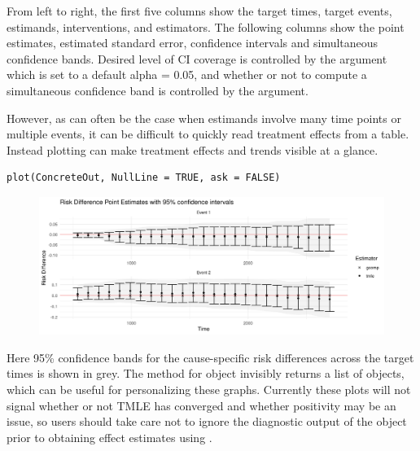 \documentclass{report}
\newcommand{\1}{\ensuremath{\mathbf{1}}}
\begin{document}
From left to right, the first five columns show the target times, target events, estimands, interventions, and estimators. The following columns show the point estimates, estimated standard error, confidence intervals and simultaneous confidence bands. Desired level of CI coverage is controlled by the  argument which is set to a default alpha = 0.05, and whether or not to compute a simultaneous confidence band is controlled by the  argument.

However, as can often be the case when estimands involve many time points or multiple events, it can be difficult to quickly read treatment effects from a table. Instead plotting can make treatment effects and trends visible at a glance.

\lstset{language=r,label= ,caption= ,captionpos=b,numbers=none}
\begin{lstlisting}
plot(ConcreteOut, NullLine = TRUE, ask = FALSE)
\end{lstlisting}

\begin{figure}[H]
\includegraphics[width=\linewidth]{fig/concrete-pbc.png}
\end{figure}

Here 95\% confidence bands for the cause-specific risk differences across the target times is shown in grey. The  method for  object invisibly returns a list of  objects, which can be useful for personalizing these graphs. Currently these plots will not signal whether or not TMLE has converged and whether positivity may be an issue, so users should take care not to ignore the diagnostic output of the  object prior to obtaining effect estimates using .
\end{document}
